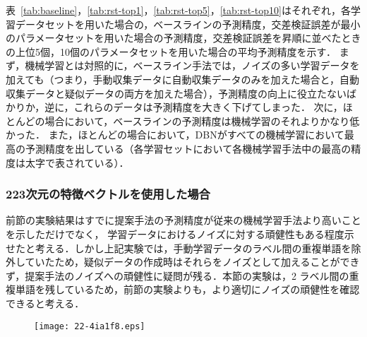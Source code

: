 \documentclass[japanese]{jnlp_1.4}
\begin{document}
表~\ref{tab:baseline}，\ref{tab:rst-top1}，\ref{tab:rst-top5}，\ref{tab:rst-top10}はそれぞれ，各学習データセットを用いた場合の，ベースラインの予測精度，交差検証誤差が最小のパラメータセットを用いた場合の予測精度，交差検証誤差を昇順に並べたときの上位5個，10個のパラメータセットを用いた場合の平均予測精度を示す．
まず，機械学習とは対照的に，ベースライン手法では，ノイズの多い学習データを加えても（つまり，手動収集データに自動収集データのみを加えた場合と，自動収集データと疑似データの両方を加えた場合），予測精度の向上に役立たないばかりか，逆に，これらのデータは予測精度を大きく下げてしまった．
次に，ほとんどの場合において，ベースラインの予測精度は機械学習のそれよりかなり低かった．
また，ほとんどの場合において，DBNがすべての機械学習において最高の予測精度を出している（各学習セットにおいて各機械学習手法中の最高の精度は太字で表されている）．

\begin{table}[t]
\label{tab:rst-top1}

\end{table}
\begin{table}[t]
\label{tab:rst-top5}

\end{table}


\subsubsection{223次元の特徴ベクトルを使用した場合}

前節の実験結果はすでに提案手法の予測精度が従来の機械学習手法より高いことを示しただけでなく，
学習データにおけるノイズに対する頑健性もある程度示せたと考える．しかし上記実験では，手動学習データのラベル間の重複単語を除外していたため，疑似データの作成時はそれらをノイズとして加えることができず，提案手法のノイズへの頑健性に疑問が残る．本節の実験は，2 ラベル間の重複単語を残しているため，前節の実験よりも，より適切にノイズの頑健性を確認できると考える．

\begin{table}[t]
\label{tab:rst-top10}

\end{table}

\begin{figure}[p]
\begin{center}
\texttt{[image: 22-4ia1f8.eps]}
\end{center}
\label{fig:prec-add}
\end{figure}
\end{document}
